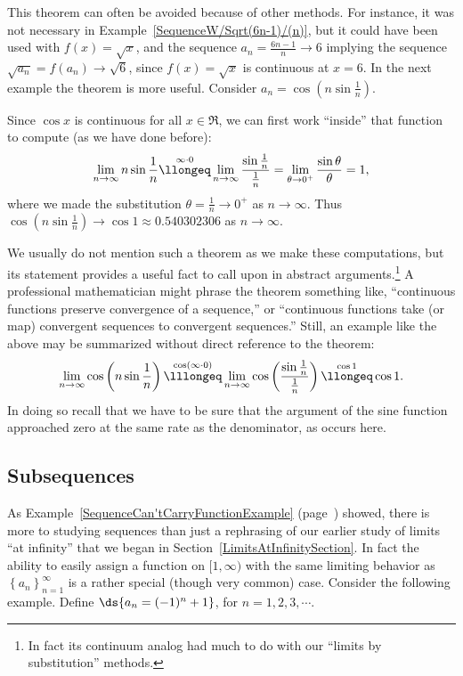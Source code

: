 This theorem can often be avoided because of other methods.
For instance, it was not necessary in
Example~\ref{SequenceW/Sqrt(6n-1)/(n)}, but it could have been
used with $f(x)=\sqrt{x}$, and the sequence 
$a_n=\frac{6n-1}n\longrightarrow6$ implying the sequence
$\sqrt{a_n}=f(a_n)\longrightarrow\sqrt6$, since $f(x)=\sqrt{x}$
is continuous at $x=6$.  In the next example the theorem is
more useful.
\bex Consider $a_n=\cos\left(n\sin\frac1n\right)$.

Since $\cos x$ is continuous for all $x\in\Re$, we can first work 
``inside'' that function to compute (as we have done before):
$$\lim_{n\to\infty}n\sin\frac1n\overset{\infty\cdot0}{\llongeq}
\lim_{n\to\infty}\frac{\sin\frac1n}{\frac1n}
=\lim_{\theta\to0^+}\frac{\sin\theta}{\theta}
=1,$$
where we made the substitution $\theta=\frac1n\to0^+$ as $n\to\infty$.
Thus $\cos\left(n\sin\frac1n\right)\to\cos1\approx0.540302306$
as $n\to\infty$.
\eex

We usually do not mention such a theorem as we make these computations,
but its statement provides a useful fact to call upon in abstract
arguments.\footnote{%
In fact its continuum analog had much to do with
our ``limits by substitution'' methods.
}
A professional mathematician might phrase the
theorem something like, ``continuous functions preserve
convergence of a sequence,'' or ``continuous functions take (or map)
convergent sequences to convergent sequences.''  Still, an example like
the above may be summarized without direct reference to
the theorem:
$$\lim_{n\to\infty}\cos\left(n\sin\frac1n\right)
\overset{\cos(\infty\cdot0)}{\lllongeq}
\lim_{n\to\infty}\cos\left(\frac{\sin\frac1n}{\frac1n}\right)
\overset{\cos1}{\llongeq}\cos1.$$
In doing so recall that we have to be sure that the argument
of the sine function approached zero at the same rate as the
denominator, as occurs here.




\subsection{Subsequences}
As Example~\ref{SequenceCan'tCarryFunctionExample}
(page~\pageref{SequenceCan'tCarryFunctionExample})
showed, there is more to studying sequences
than just a rephrasing of our earlier study of limits ``at infinity''
that we began in Section~\ref{LimitsAtInfinitySection}.
In fact the ability to easily assign a function on $[1,\infty)$
with the same limiting behavior as $\left\{a_n\right\}_{n=1}^\infty$
is a rather special (though very common) case.  
Consider the following example.
\bex Define $\ds{a_n=(-1)^n+1}$, for $n=1,2,3,\cdots.$  

